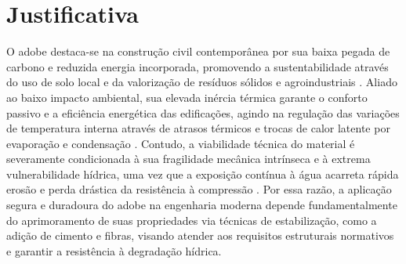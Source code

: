 \section{Justificativa}



O adobe destaca-se na construção civil contemporânea por sua baixa pegada de carbono e reduzida energia incorporada, promovendo a sustentabilidade através do uso de solo local e da valorização de resíduos sólidos e agroindustriais \cite{Arduin2022, Khunaprapakorn2025, Arduin2024, Aspillaga2024}. Aliado ao baixo impacto ambiental, sua elevada inércia térmica garante o conforto passivo e a eficiência energética das edificações, agindo na regulação das variações de temperatura interna através de atrasos térmicos e trocas de calor latente por evaporação e condensação \cite{Christoforou2016, Heracleous2023, Rincon2019, Khunaprapakorn2025, Giada2019}. Contudo, a viabilidade técnica do material é severamente condicionada à sua fragilidade mecânica intrínseca e à extrema vulnerabilidade hídrica, uma vez que a exposição contínua à água acarreta rápida erosão e perda drástica da resistência à compressão \cite{Brito2023, Dormohamadi2020, Fages2022,Dao2018,Day1993, Dormohamadi2024}. Por essa razão, a aplicação segura e duradoura do adobe na engenharia moderna depende fundamentalmente do aprimoramento de suas propriedades via técnicas de estabilização, como a adição de cimento e fibras, visando atender aos requisitos estruturais normativos e garantir a resistência à degradação hídrica.


